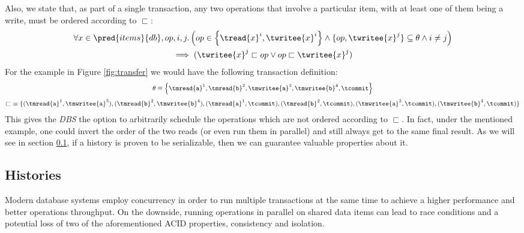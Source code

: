 Also, we state that, as part of a single transaction, any two operations that involve a particular item, with at least one of them being a write, must be ordered according to $\sqsubset$:
\begin{gather*}
	\forall x \in \pred{items}{db}, op, i, j \ldotp \left( op \in \left\lbrace \tread{x}^i, \twritee{x}^i \right\rbrace \land \lbrace op, \twritee{x}^j \rbrace \subseteq \theta \land i \neq j \right) \\ \implies (\twritee{x}^j \sqsubset op \lor op \sqsubset \twritee{x}^j)
\end{gather*}
For the example in Figure \ref{fig:transfer} we would have the following transaction definition:
\begin{gather*}
\theta \equiv \left\lbrace \tmread{\texttt{a}}^1, \tmread{\texttt{b}}^2, \tmwritee{\texttt{a}}^3, \tmwritee{\texttt{b}}^4, \tcommit \right\rbrace
\\[0.4em]
\sqsubset\ \equiv \{ (\tmread{\texttt{a}}^1, \tmwritee{\texttt{a}}^3), (\tmread{\texttt{b}}^2, \tmwritee{\texttt{b}}^4), (\tmread{\texttt{a}}^1, \tcommit), (\tmread{\texttt{b}}^2, \tcommit), (\tmwritee{\texttt{a}}^3, \tcommit), (\tmwritee{\texttt{b}}^4, \tcommit) \}
\end{gather*}
This gives the \textit{DBS} the option to arbitrarily schedule the operations which are not ordered according to $\sqsubset$. In fact, under the mentioned example, one could invert the order of the two reads (or even run them in parallel) and still always get to the same final result. As we will see in section \ref{histories}, if a history is proven to be serializable, then we can guarantee valuable properties about it.

\tocless\subsection{Histories} \label{histories}

Modern database systems employ concurrency in order to run multiple transactions at the same time to achieve a higher performance and better operations throughput. On the downside, running operations in parallel on shared data items can lead to race conditions and a potential loss of two of the aforementioned ACID properties, consistency and isolation.

